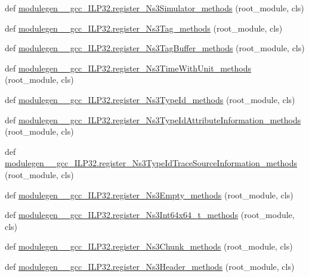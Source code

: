 \begin{DoxyCompactItemize}
\item 
def \hyperlink{namespacemodulegen____gcc__ILP32_aa549fc85b0feec2f8115e70db4c26c2a}{modulegen\+\_\+\+\_\+gcc\+\_\+\+I\+L\+P32.\+register\+\_\+\+Ns3\+Simulator\+\_\+methods} (root\+\_\+module, cls)
\item 
def \hyperlink{namespacemodulegen____gcc__ILP32_a5578ddbed750d0c575df9ed36c4d86d6}{modulegen\+\_\+\+\_\+gcc\+\_\+\+I\+L\+P32.\+register\+\_\+\+Ns3\+Tag\+\_\+methods} (root\+\_\+module, cls)
\item 
def \hyperlink{namespacemodulegen____gcc__ILP32_a24ac4bbf908e2dfdea2eca022c057906}{modulegen\+\_\+\+\_\+gcc\+\_\+\+I\+L\+P32.\+register\+\_\+\+Ns3\+Tag\+Buffer\+\_\+methods} (root\+\_\+module, cls)
\item 
def \hyperlink{namespacemodulegen____gcc__ILP32_a8942fb893268c4774333e3a81c3cf7d3}{modulegen\+\_\+\+\_\+gcc\+\_\+\+I\+L\+P32.\+register\+\_\+\+Ns3\+Time\+With\+Unit\+\_\+methods} (root\+\_\+module, cls)
\item 
def \hyperlink{namespacemodulegen____gcc__ILP32_a6436195ea7813af4a6f5611bac15066d}{modulegen\+\_\+\+\_\+gcc\+\_\+\+I\+L\+P32.\+register\+\_\+\+Ns3\+Type\+Id\+\_\+methods} (root\+\_\+module, cls)
\item 
def \hyperlink{namespacemodulegen____gcc__ILP32_afa4c5c57202d38b0cdfa0d7fd58b5797}{modulegen\+\_\+\+\_\+gcc\+\_\+\+I\+L\+P32.\+register\+\_\+\+Ns3\+Type\+Id\+Attribute\+Information\+\_\+methods} (root\+\_\+module, cls)
\item 
def \hyperlink{namespacemodulegen____gcc__ILP32_a839bc77808351c50cde37c45869c9ac2}{modulegen\+\_\+\+\_\+gcc\+\_\+\+I\+L\+P32.\+register\+\_\+\+Ns3\+Type\+Id\+Trace\+Source\+Information\+\_\+methods} (root\+\_\+module, cls)
\item 
def \hyperlink{namespacemodulegen____gcc__ILP32_aaaf5b4399b80410455abaa6263f1cd29}{modulegen\+\_\+\+\_\+gcc\+\_\+\+I\+L\+P32.\+register\+\_\+\+Ns3\+Empty\+\_\+methods} (root\+\_\+module, cls)
\item 
def \hyperlink{namespacemodulegen____gcc__ILP32_a162a098f5d929c52ad2e6c3ed1f54204}{modulegen\+\_\+\+\_\+gcc\+\_\+\+I\+L\+P32.\+register\+\_\+\+Ns3\+Int64x64\+\_\+t\+\_\+methods} (root\+\_\+module, cls)
\item 
def \hyperlink{namespacemodulegen____gcc__ILP32_acca0b09c03a65420f803907cd64df814}{modulegen\+\_\+\+\_\+gcc\+\_\+\+I\+L\+P32.\+register\+\_\+\+Ns3\+Chunk\+\_\+methods} (root\+\_\+module, cls)
\item 
def \hyperlink{namespacemodulegen____gcc__ILP32_aa49e4221854466e73c3442d993373495}{modulegen\+\_\+\+\_\+gcc\+\_\+\+I\+L\+P32.\+register\+\_\+\+Ns3\+Header\+\_\+methods} (root\+\_\+module, cls)

\end{DoxyCompactItemize}
